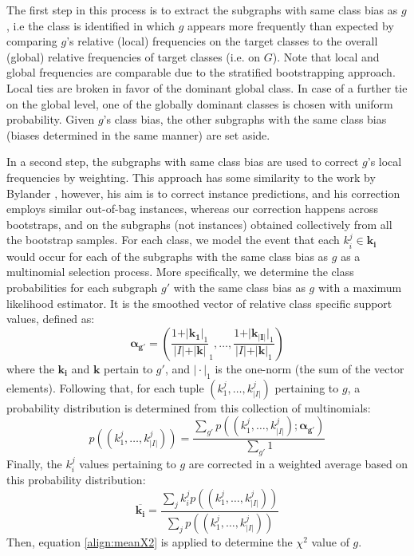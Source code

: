 \documentclass{article}
\begin{document}
The first step in this process is to extract the subgraphs with same class bias
as $g$, i.e the class is identified in which $g$ appears more frequently than
expected by comparing $g$'s relative (local) frequencies on the target classes
to the overall (global) relative frequencies of target classes (i.e. on $G$).
Note that local and global frequencies are comparable due to the stratified
bootstrapping approach. Local ties are broken in favor of the dominant global
class. In case of a further tie on the global level, one of the globally
dominant classes is chosen with uniform probability. Given $g$'s class bias,
the other subgraphs with the same class bias (biases determined in the same
manner) are set aside.

In a second step, the subgraphs with same class bias are used to correct $g$'s
local frequencies by weighting. This approach has some similarity to the work
by Bylander \cite{bylander02estimating}, however, his aim is to correct
instance predictions, and his correction employs similar out-of-bag instances,
whereas our correction happens across bootstraps, and on the subgraphs (not
instances) obtained collectively from all the bootstrap samples.  For each
class, we model the event that each $k_i^j \in \mathbf{k_i}$ would occur for
each of the subgraphs with the same class bias as $g$ as a multinomial
selection process.  More specifically, we determine the class probabilities for
each subgraph $g'$ with the same class bias as $g$ with a maximum
likelihood estimator. It is the smoothed vector of relative class specific support
values, defined as:
\begin{equation}
  \mathbf{\alpha_{g'}} = \left(\frac{1+\vert\mathbf{k_1}\vert_1}{\vert I\vert+\vert\mathbf{k}\vert}_1,\ldots,\frac{1+\vert\mathbf{k_{\vert I\vert}}\vert_1}{\vert I\vert+\vert\mathbf{k}\vert_1}\right)
  \label{eqn:mlexpr}
\end{equation}
where the $\mathbf{k_i}$ and $\mathbf{k}$ pertain to $g'$, and $\vert\cdot\vert_1$ is the one-norm (the sum of the vector elements). Following that, for
each tuple $(k_1^j,\ldots,k_{\vert I\vert}^j)$ pertaining to $g$, a probability distribution is
determined from this collection of multinomials:
\begin{equation}
  p((k_1^j,\ldots,k_{\vert I\vert}^j))=\frac{\sum_{g'} p((k_1^j,\ldots,k_{\vert I\vert}^j); \mathbf{\alpha_{g'}})}{\sum_{g'}1}
  \label{eqn:avgpr}
\end{equation}
Finally, the $k_i^j$ values pertaining to $g$ are corrected in a weighted average
based on this probability distribution:
\begin{equation}
  \overline{\mathbf{k_i}}=\frac{\sum_j k_i^j p((k_1^j,\ldots,k_{\vert I\vert}^j))}{\sum_j p((k_1^j,\ldots,k_{\vert I\vert}^j))}
  \label{eqn:avgki}
\end{equation}
Then, equation \ref{align:meanX2} is applied to determine the $\chi^2$ value of $g$.
\end{document}
